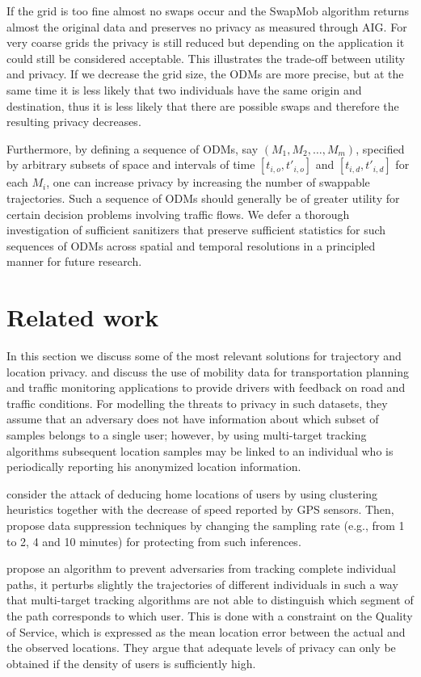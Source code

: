 \documentclass[times,twocolumn,final,authoryear]{elsarticle}
\begin{document}
If the grid is too fine almost no swaps occur
and the SwapMob algorithm returns almost the original data and preserves no privacy as measured through AIG. 
For very coarse grids the privacy is still reduced but depending on the application it could still
be considered acceptable. 
This illustrates the trade-off between utility and privacy. If we decrease the grid size, the ODMs are more precise, but at the same time it is less likely that two individuals have the same origin and destination, thus it is less likely that there are possible swaps and therefore the resulting privacy decreases.

Furthermore, by defining a sequence of ODMs, say $(M_1,M_2,\ldots,M_m)$, specified by arbitrary subsets of space 
and intervals of time $[t_{i,o},t'_{i,o}]$ and $[t_{i,d},t'_{i,d}]$ for each $M_i$, one can increase privacy by increasing the number of swappable trajectories. Such a sequence of ODMs should generally be of greater utility for certain decision problems involving traffic flows. We defer a thorough investigation of sufficient sanitizers that preserve sufficient statistics for such sequences of ODMs across spatial and temporal resolutions in a principled manner for future research.  

\section{Related work}
In this section we discuss some of the most relevant solutions for trajectory and location privacy.
\cite{Hoh2005} and \cite{Hoh06} discuss the use of mobility data for transportation planning and traffic monitoring applications to provide drivers with feedback on road and traffic conditions.
For modelling the threats to privacy in such datasets, they assume that an adversary does not have information about which subset of samples belongs to a single user; 
however, by using multi-target tracking algorithms \citep{Reid79analgorithm} subsequent location samples may be linked to an individual who is periodically reporting his anonymized location information.

\cite{Hoh06} consider the attack of deducing home locations of users by using clustering heuristics together with the decrease of speed reported by GPS sensors. Then, propose data suppression techniques by changing the sampling rate (e.g., from 1 to 2, 4 and 10 minutes) for protecting from such inferences.

\cite{Hoh2005} propose an algorithm to prevent adversaries from tracking complete individual paths, it 
perturbs slightly the trajectories of different individuals in such a way that multi-target tracking algorithms are not able to distinguish which segment of the path corresponds to which user.
This is done with a constraint on the Quality of Service, which is expressed as the mean location error between the actual and the observed locations. They argue that adequate levels of privacy can only be obtained if the density of users is sufficiently high.
\end{document}
